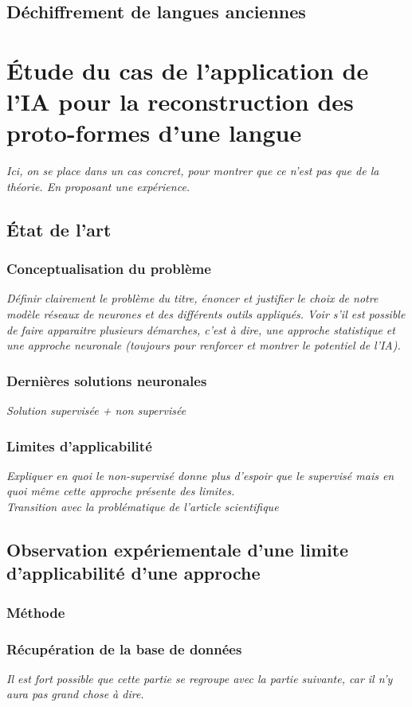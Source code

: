 \documentclass[12pt, french]{report}
\begin{document}
\section{Déchiffrement de langues anciennes}

\chapter{Étude du cas de l'application de l'IA pour la reconstruction des proto-formes d'une langue}
\textit{Ici, on se place dans un cas concret, pour montrer que ce n'est pas que de la théorie. En proposant une expérience.}
\section{État de l'art}
\subsection{Conceptualisation du problème}
\textit{Définir clairement le problème du titre, énoncer et justifier le choix de notre modèle réseaux de neurones et des différents outils appliqués. Voir s'il est possible de faire apparaitre plusieurs démarches, c'est à dire, une approche statistique et une approche neuronale (toujours pour renforcer et montrer le potentiel de l'IA).}

\subsection{Dernières solutions neuronales}
\textit{Solution supervisée + non supervisée}

\subsection{Limites d'applicabilité}
\textit{Expliquer en quoi le non-supervisé donne plus d'espoir
que le supervisé mais en quoi même cette approche présente des
limites.\\
Transition avec la problématique de l'article scientifique}
\section{Observation expériementale d'une limite d'applicabilité d'une approche}
\subsection{Méthode}
\subsection{Récupération de la base de données}
\textit{Il est fort possible que cette partie se regroupe avec la partie suivante, car il n'y aura pas grand chose à dire.}
\end{document}
